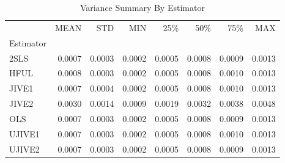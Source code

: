 \begin{table}[ht]
\centering
\caption{Variance Summary By Estimator}
\begin{tabular}{lrrrrrrr}
\toprule
 & MEAN & STD & MIN & 25\% & 50\% & 75\% & MAX \\
Estimator &  &  &  &  &  &  &  \\
\midrule
2SLS & 0.0007 & 0.0003 & 0.0002 & 0.0005 & 0.0008 & 0.0009 & 0.0013 \\
HFUL & 0.0008 & 0.0003 & 0.0002 & 0.0005 & 0.0008 & 0.0010 & 0.0013 \\
JIVE1 & 0.0007 & 0.0004 & 0.0002 & 0.0005 & 0.0008 & 0.0010 & 0.0013 \\
JIVE2 & 0.0030 & 0.0014 & 0.0009 & 0.0019 & 0.0032 & 0.0038 & 0.0048 \\
OLS & 0.0007 & 0.0003 & 0.0002 & 0.0005 & 0.0008 & 0.0009 & 0.0013 \\
UJIVE1 & 0.0007 & 0.0003 & 0.0002 & 0.0005 & 0.0008 & 0.0010 & 0.0013 \\
UJIVE2 & 0.0007 & 0.0003 & 0.0002 & 0.0005 & 0.0008 & 0.0009 & 0.0013 \\
\bottomrule
\end{tabular}
\end{table}
